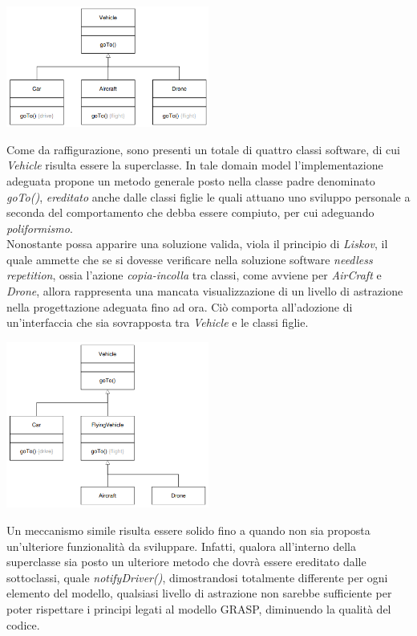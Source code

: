 \documentclass{article}
\begin{document}
\begin{center}
    \includegraphics*[width=0.5\textwidth]{foto 1.png}
\end{center}\vspace*{7pt}
Come da raffigurazione, sono presenti un totale di quattro classi software, di cui \textit{Vehicle} risulta essere la superclasse. In tale domain model l'implementazione adeguata propone un metodo generale posto nella classe padre denominato \textit{goTo()}, \textit{ereditato} anche dalle classi figlie le quali attuano uno sviluppo personale a seconda del comportamento che debba essere compiuto, per cui adeguando \textit{poliformismo}.\vspace*{7pt}\\
Nonostante possa apparire una soluzione valida, viola il principio di \textit{Liskov}, il quale ammette che se si dovesse verificare nella soluzione software \textit{needless repetition}, ossia l'azione \textit{copia-incolla} tra classi, come avviene per \textit{AirCraft} e \textit{Drone}, allora rappresenta una mancata visualizzazione di un livello di astrazione nella progettazione adeguata fino ad ora. Ciò comporta all'adozione di un'interfaccia che sia sovrapposta tra \textit{Vehicle} e le classi figlie. 
\begin{center}
    \includegraphics*[width=0.5\textwidth]{foto 2.png}
\end{center}
Un meccanismo simile risulta essere solido fino a quando non sia proposta un'ulteriore funzionalità da sviluppare. Infatti, qualora all'interno della superclasse sia posto un ulteriore metodo che dovrà essere ereditato dalle sottoclassi, quale \textit{notifyDriver()}, dimostrandosi totalmente differente per ogni elemento del modello, qualsiasi livello di astrazione non sarebbe sufficiente per poter rispettare i principi legati al modello GRASP, diminuendo la qualità del codice.
\end{document}
